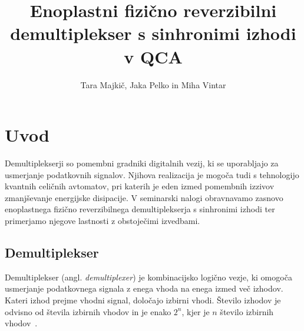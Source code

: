 
\graphicspath{{Skupina21/img/}}

\title{Enoplastni fizično reverzibilni demultiplekser s sinhronimi izhodi v QCA}
\author{Tara Majkič, Jaka Pelko in Miha Vintar}
\maketitle


\section{Uvod}
\label{g21:sec:uvod}

Demultiplekserji so pomembni gradniki digitalnih vezij, ki se uporabljajo za usmerjanje podatkovnih signalov. Njihova realizacija je mogoča tudi s tehnologijo kvantnih celičnih avtomatov, pri katerih je eden izmed pomembnih izzivov zmanjševanje energijske disipacije. V seminarski nalogi obravnavamo zasnovo enoplastnega fizično reverzibilnega demultiplekserja s sinhronimi izhodi ter primerjamo njegove lastnosti z obstoječimi izvedbami.

\subsection{Demultiplekser}
\label{g21:sec:demux}

Demultiplekser (angl. \emph{demultiplexer}) je kombinacijsko logično vezje, ki omogoča usmerjanje podatkovnega signala z enega vhoda na enega izmed več izhodov. Kateri izhod prejme vhodni signal, določajo izbirni vhodi. Število izhodov je odvisno od števila izbirnih vhodov in je enako $2^n$, kjer je $n$ število izbirnih vhodov~\cite{g21:dsouza2026}.

